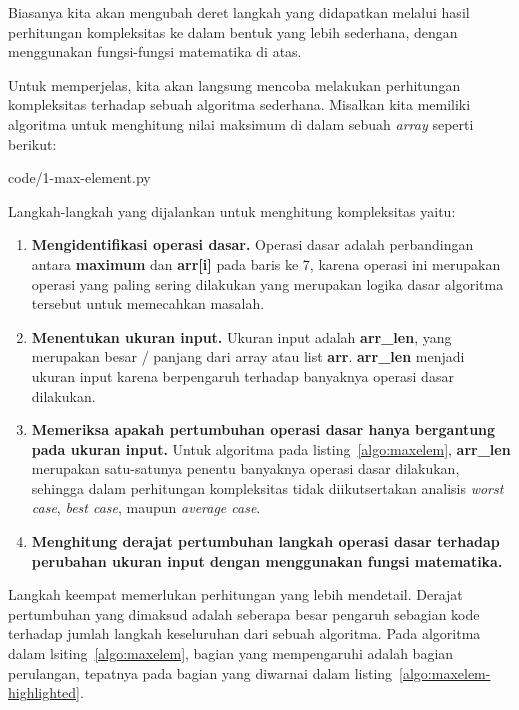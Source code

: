 Biasanya kita akan mengubah deret langkah yang didapatkan melalui hasil perhitungan kompleksitas ke dalam bentuk yang lebih sederhana, dengan menggunakan fungsi-fungsi matematika di atas.

Untuk memperjelas, kita akan langsung mencoba melakukan perhitungan kompleksitas terhadap sebuah algoritma sederhana. Misalkan kita memiliki algoritma untuk menghitung nilai maksimum di dalam sebuah \textit{array} seperti berikut:


                {code/1-max-element.py}

\FloatBarrier

Langkah-langkah yang dijalankan untuk menghitung kompleksitas yaitu:

\begin{enumerate}
    \item \textbf{Mengidentifikasi operasi dasar.} Operasi dasar adalah perbandingan antara \textbf{maximum} dan \textbf{arr[i]} pada baris ke 7, karena operasi ini merupakan operasi yang paling sering dilakukan yang merupakan logika dasar algoritma tersebut untuk memecahkan masalah.
    \item \textbf{Menentukan ukuran input.} Ukuran input adalah \textbf{arr\_len}, yang merupakan besar / panjang dari array atau list \textbf{arr}. \textbf{arr\_len} menjadi ukuran input karena berpengaruh terhadap banyaknya operasi dasar dilakukan.
    \item \textbf{Memeriksa apakah pertumbuhan operasi dasar hanya bergantung pada ukuran input.} Untuk algoritma pada listing~\ref{algo:maxelem}, \textbf{arr\_len} merupakan satu-satunya penentu banyaknya operasi dasar dilakukan, sehingga dalam perhitungan kompleksitas tidak diikutsertakan analisis \textit{worst case}, \textit{best case}, maupun \textit{average case}.
    \item \textbf{Menghitung derajat pertumbuhan langkah operasi dasar terhadap perubahan ukuran input dengan menggunakan fungsi matematika.} 
\end{enumerate}

Langkah keempat memerlukan perhitungan yang lebih mendetail. Derajat pertumbuhan yang dimaksud adalah seberapa besar pengaruh sebagian kode terhadap jumlah langkah keseluruhan dari sebuah algoritma. Pada algoritma dalam lsiting~\ref{algo:maxelem}, bagian yang mempengaruhi adalah bagian perulangan, tepatnya pada bagian yang diwarnai dalam listing~\ref{algo:maxelem-highlighted}.

